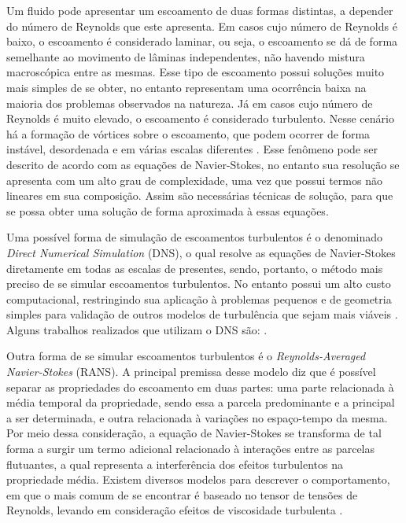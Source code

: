\documentclass[_ArquivoPrincipal.tex]{subfiles}
\begin{document}
Um fluido pode apresentar um escoamento de duas formas distintas, a depender do número de Reynolds que este apresenta. Em casos cujo número de Reynolds é baixo, o escoamento é considerado laminar, ou seja, o escoamento se dá de forma semelhante ao movimento de lâminas independentes, não havendo mistura macroscópica entre as mesmas. Esse tipo de escoamento possui soluções muito mais simples de se obter, no entanto representam uma ocorrência baixa na maioria dos problemas observados na natureza. Já em casos cujo número de Reynolds é muito elevado, o escoamento é considerado turbulento. Nesse cenário há a formação de vórtices sobre o escoamento, que podem ocorrer de forma instável, desordenada e em várias escalas diferentes \cite{popiolek2005analise,shaughnessy2005introduction}. Esse fenômeno pode ser descrito de acordo com as equações de Navier-Stokes, no entanto sua resolução se apresenta com um alto grau de complexidade, uma vez que possui termos não lineares em sua composição. Assim são necessárias técnicas de solução, para que se possa obter uma solução de forma aproximada à essas equações.

Uma possível forma de simulação de escoamentos turbulentos é o denominado \textit{Direct Numerical Simulation} (DNS), o qual resolve as equações de Navier-Stokes diretamente em todas as escalas de presentes, sendo, portanto, o método mais preciso de se simular escoamentos turbulentos. No entanto possui um alto custo computacional, restringindo sua aplicação à problemas pequenos e de geometria simples para validação de outros modelos de turbulência que sejam mais viáveis \cite{piomelli1999large,yokokawa200216}. Alguns trabalhos realizados que utilizam o DNS são: .

Outra forma de se simular escoamentos turbulentos é o \textit{Reynolds-Averaged Navier-Stokes} (RANS). A principal premissa desse modelo diz que é possível separar as propriedades do escoamento em duas partes: uma parte relacionada à média temporal da propriedade, sendo essa a parcela predominante e a principal a ser determinada, e outra relacionada à variações no espaço-tempo da mesma. Por meio dessa consideração, a equação de Navier-Stokes se transforma de tal forma a surgir um termo adicional relacionado à interações entre as parcelas flutuantes, a qual representa a interferência dos efeitos turbulentos na propriedade média. Existem diversos modelos para descrever o comportamento, em que o mais comum de se encontrar é baseado no tensor de tensões de Reynolds, levando em consideração efeitos de viscosidade turbulenta \cite{piomelli1999large,alfonsi2009reynolds,bazilevs2010large,ling2015evaluation}.
\end{document}
